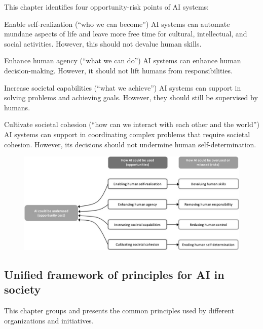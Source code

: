 This chapter identifies four opportunity-risk points of AI systems:
\begin{descriptionlist}
    \item[Enable self-realization]  (``who we can become'')
        AI systems can automate mundane aspects of life and leave more free time for cultural, intellectual, and social activities. However, this should not devalue human skills.

    \item[Enhance human agency]  (``what we can do'')
        AI systems can enhance human decision-making. However, it should not lift humans from responsibilities.

    \item[Increase societal capabilities]  (``what we achieve'')
        AI systems can support in solving problems and achieving goals. However, they should still be supervised by humans.

    \item[Cultivate societal cohesion]  (``how can we interact with each other and the world'')
        AI systems can support in coordinating complex problems that require societal cohesion. However, its decisions should not undermine human self-determination.
\end{descriptionlist}

\begin{figure}[H]
    \centering
    \includegraphics[width=0.65\linewidth]{./img/ai4people_opportunities_risks.png}
\end{figure}


\subsection{Unified framework of principles for AI in society}

This chapter groups and presents the common principles used by different organizations and initiatives.

